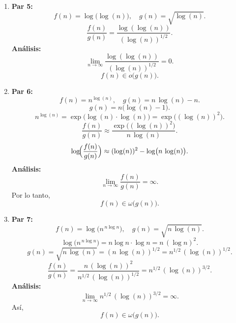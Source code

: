 \documentclass[12pt]{article}
\begin{document}
\begin{enumerate}
  \item \textbf{Par 5:}
  \[
    f(n) = \log\bigl(\log(n)\bigr), \quad g(n) = \sqrt{\log(n)}.
  \]
  \[
    \frac{f(n)}{g(n)} = \frac{\log(\log(n))}{(\log(n))^{1/2}}.
  \]
  \textbf{Análisis:}
  \[
    \lim_{n \to \infty} \frac{\log(\log(n))}{(\log(n))^{1/2}} = 0.
  \]
  \[
    f(n) \in o\bigl(g(n)\bigr).
  \]

  \item \textbf{Par 6:}
  \[
    f(n) = n^{\log(n)}, \quad g(n) = n \,\log(n) - n.
  \]
  \[
    g(n) = n\bigl(\log(n)-1\bigr).
  \]
  \[
    n^{\log(n)} = \exp\bigl(\log(n)\cdot\log(n)\bigr)= \exp\bigl((\log(n))^2\bigr).
  \]
  \[
    \frac{f(n)}{g(n)} \approx \frac{\exp\bigl((\log(n))^2\bigr)}{n\,\log(n)}.
  \]
  \[
    \log\!\Bigl(\frac{f(n)}{g(n)}\Bigr) \approx (\log(n))^2 - \log\bigl(n\,\log(n)\bigr).
  \]
  \textbf{Análisis:}
  \[
    \lim_{n\to\infty} \frac{f(n)}{g(n)} = \infty.
  \]
  Por lo tanto,
  \[
    f(n) \in \omega\bigl(g(n)\bigr).
  \]

  \item \textbf{Par 7:}
  \[
    f(n) = \log\bigl(n^{\,n \log n}\bigr), \quad g(n) = \sqrt{n \,\log(n)}.
  \]
  \[
    \log\bigl(n^{\,n \log n}\bigr) = n \log n \cdot \log n = n\,(\log n)^2.
  \]
  \[
    g(n) = \sqrt{n\,\log(n)} = (n\,\log(n))^{1/2} = n^{1/2}\,(\log(n))^{1/2}.
  \]
  \[
    \frac{f(n)}{g(n)} = \frac{n\,(\log(n))^2}{n^{1/2}\,(\log(n))^{1/2}} = n^{1/2}\,(\log(n))^{3/2}.
  \]
  \textbf{Análisis:}
  \[
    \lim_{n \to \infty} n^{1/2}\,(\log(n))^{3/2} = \infty.
  \]
  Así,
  \[
    f(n) \in \omega\bigl(g(n)\bigr).
  \]


\end{enumerate}
\end{document}
